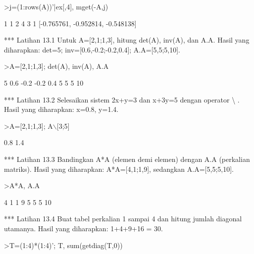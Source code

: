 \documentclass[a4paper,10pt]{article}
\begin{document}
\begin{eulernotebook}
\begin{eulercomment}
\begin{eulercomment}
\begin{eulercomment}
\begin{eulercomment}
\begin{eulercomment}
\begin{eulercomment}
\begin{eulercomment}
\begin{eulercomment}
\begin{eulercomment}
\begin{eulercomment}
\begin{eulercomment}
\begin{eulercomment}
\begin{eulerprompt}
>j=(1:rows(A))'|ex[,4], mget(-A,j)
\end{eulerprompt}
\begin{euleroutput}
              1             1 
              2             4 
              3             1 
  [-0.765761,  -0.952814,  -0.548138]
\end{euleroutput}
\begin{eulercomment}
*** Latihan 13.1
Untuk A=[2,1;1,3], hitung det(A), inv(A), dan A.A.
Hasil yang diharapkan: det=5; inv=[0.6,-0.2;-0.2,0.4]; A.A=[5,5;5,10].
\end{eulercomment}
\begin{eulerprompt}
>A=[2,1;1,3]; det(A), inv(A), A.A
\end{eulerprompt}
\begin{euleroutput}
  5
            0.6          -0.2 
           -0.2           0.4 
              5             5 
              5            10 
\end{euleroutput}
\begin{eulercomment}
*** Latihan 13.2
Selesaikan sistem 2x+y=3 dan x+3y=5 dengan operator \textbackslash{} .
Hasil yang diharapkan: x=0.8, y=1.4.
\end{eulercomment}
\begin{eulerprompt}
>A=[2,1;1,3]; A\(\backslash\)[3;5]
\end{eulerprompt}
\begin{euleroutput}
            0.8 
            1.4 
\end{euleroutput}
\begin{eulercomment}
*** Latihan 13.3
Bandingkan A*A (elemen demi elemen) dengan A.A (perkalian matriks).
Hasil yang diharapkan: A*A=[4,1;1,9], sedangkan A.A=[5,5;5,10].
\end{eulercomment}
\begin{eulerprompt}
>A*A, A.A
\end{eulerprompt}
\begin{euleroutput}
              4             1 
              1             9 
              5             5 
              5            10 
\end{euleroutput}
\begin{eulercomment}
*** Latihan 13.4
Buat tabel perkalian 1 sampai 4 dan hitung jumlah diagonal utamanya.
Hasil yang diharapkan: 1+4+9+16 = 30.
\end{eulercomment}
\begin{eulerprompt}
>T=(1:4)*(1:4)'; T, sum(getdiag(T,0))
\end{eulerprompt}

\end{eulercomment}
\end{eulercomment}
\end{eulercomment}
\end{eulercomment}
\end{eulercomment}
\end{eulercomment}
\end{eulercomment}
\end{eulercomment}
\end{eulercomment}
\end{eulercomment}
\end{eulercomment}
\end{eulercomment}
\end{eulernotebook}
\end{document}
